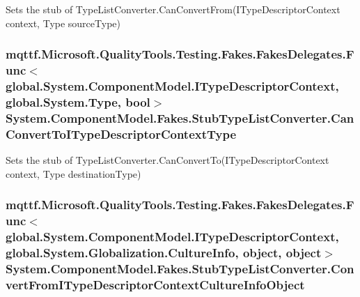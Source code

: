 Sets the stub of Type\-List\-Converter.\-Can\-Convert\-From(\-I\-Type\-Descriptor\-Context context, Type source\-Type)

\hypertarget{class_system_1_1_component_model_1_1_fakes_1_1_stub_type_list_converter_a6915a9a77c420caf3bfbb059e2622218}{
\subsubsection[{Can\-Convert\-To\-I\-Type\-Descriptor\-Context\-Type}]{\setlength{\rightskip}{0pt plus 5cm}mqttf.\-Microsoft.\-Quality\-Tools.\-Testing.\-Fakes.\-Fakes\-Delegates.\-Func$<$global.\-System.\-Component\-Model.\-I\-Type\-Descriptor\-Context, global.\-System.\-Type, bool$>$ System.\-Component\-Model.\-Fakes.\-Stub\-Type\-List\-Converter.\-Can\-Convert\-To\-I\-Type\-Descriptor\-Context\-Type}}\label{class_system_1_1_component_model_1_1_fakes_1_1_stub_type_list_converter_a6915a9a77c420caf3bfbb059e2622218}


Sets the stub of Type\-List\-Converter.\-Can\-Convert\-To(\-I\-Type\-Descriptor\-Context context, Type destination\-Type)

\hypertarget{class_system_1_1_component_model_1_1_fakes_1_1_stub_type_list_converter_ab72ead6c9e7863da36d54a1ad8e09a59}{
\subsubsection[{Convert\-From\-I\-Type\-Descriptor\-Context\-Culture\-Info\-Object}]{\setlength{\rightskip}{0pt plus 5cm}mqttf.\-Microsoft.\-Quality\-Tools.\-Testing.\-Fakes.\-Fakes\-Delegates.\-Func$<$global.\-System.\-Component\-Model.\-I\-Type\-Descriptor\-Context, global.\-System.\-Globalization.\-Culture\-Info, object, object$>$ System.\-Component\-Model.\-Fakes.\-Stub\-Type\-List\-Converter.\-Convert\-From\-I\-Type\-Descriptor\-Context\-Culture\-Info\-Object}}\label{class_system_1_1_component_model_1_1_fakes_1_1_stub_type_list_converter_ab72ead6c9e7863da36d54a1ad8e09a59}


